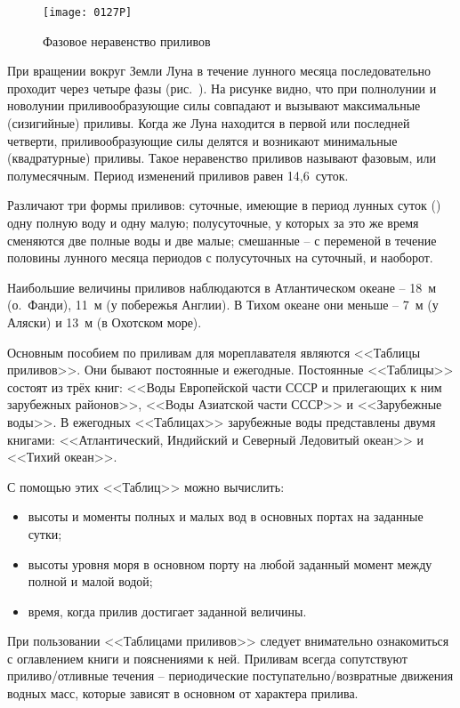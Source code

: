 \begin{figure}[htb]
  \centering{}
  \texttt{[image: 0127P]}
  \caption{Фазовое неравенство приливов}
  \label{fig:127}
\end{figure}

При вращении вокруг Земли Луна в течение лунного месяца
последовательно проходит через четыре фазы (рис.~). На
рисунке видно, что при полнолунии и новолунии приливообразующие силы
совпадают и вызывают максимальные (сизигийные) приливы. Когда же Луна
находится в первой или последней четверти, приливообразующие силы
делятся и возникают минимальные (квадратурные) приливы. Такое
неравенство приливов называют фазовым, или полумесячным. Период
изменений приливов равен 14,6~суток.

Различают три формы приливов: суточные, имеющие в период лунных суток
() одну полную воду и одну малую; полусуточные, у которых
за это же время сменяются две полные воды и две малые; смешанные \---
с переменой в течение половины лунного месяца периодов с полусуточных
на суточный, и наоборот.

Наибольшие величины приливов наблюдаются в Атлантическом океане \---
18~м (о.~Фанди), 11~м (у побережья Англии). В Тихом океане они
меньше \--- 7~м (у Аляски) и 13~м (в Охотском море).

Основным пособием по приливам для мореплавателя являются <<Таблицы
приливов>>. Они бывают постоянные и ежегодные. Постоянные <<Таблицы>>
состоят из трёх книг: <<Воды Европейской части СССР и прилегающих к
ним зарубежных районов>>, <<Воды Азиатской части СССР>> и <<Зарубежные
воды>>. В ежегодных <<Таблицах>> зарубежные воды представлены двумя
книгами: <<Атлантический, Индийский и Северный Ледовитый океан>> и
<<Тихий океан>>.

С помощью этих <<Таблиц>> можно вычислить:
\begin{itemize}
\item высоты и моменты полных и малых вод в основных портах на
  заданные сутки;
\item высоты уровня моря в основном порту на любой заданный момент
  между полной и малой водой;
\item время, когда прилив достигает заданной величины.
\end{itemize}

При пользовании <<Таблицами приливов>> следует внимательно
ознакомиться с оглавлением книги и пояснениями к ней.  Приливам всегда
сопутствуют приливо\-/отливные течения \--- периодические
поступательно\-/возвратные движения водных масс, которые зависят в
основном от характера прилива.

